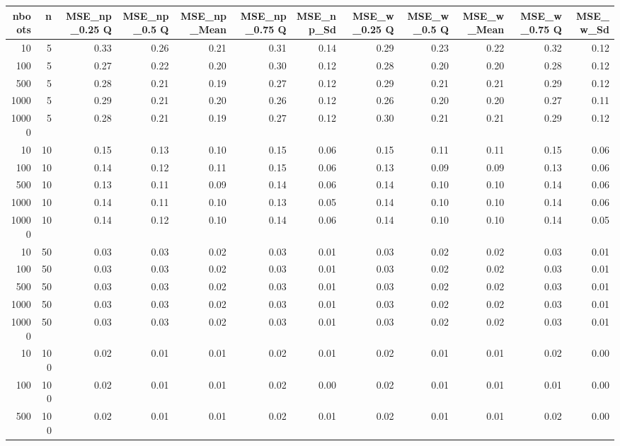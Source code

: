 \begin{table}[ht]
\centering
\begin{tabular}{rrrrrrrrrrrr}
  \hline
nboots & n & MSE\_np\_0.25 Q & MSE\_np\_0.5 Q & MSE\_np\_Mean & MSE\_np\_0.75 Q & MSE\_np\_Sd & MSE\_w\_0.25 Q & MSE\_w\_0.5 Q & MSE\_w\_Mean & MSE\_w\_0.75 Q & MSE\_w\_Sd \\ 
  \hline
10 & 5 & 0.33 & 0.26 & 0.21 & 0.31 & 0.14 & 0.29 & 0.23 & 0.22 & 0.32 & 0.12 \\ 
  100 & 5 & 0.27 & 0.22 & 0.20 & 0.30 & 0.12 & 0.28 & 0.20 & 0.20 & 0.28 & 0.12 \\ 
  500 & 5 & 0.28 & 0.21 & 0.19 & 0.27 & 0.12 & 0.29 & 0.21 & 0.21 & 0.29 & 0.12 \\ 
  1000 & 5 & 0.29 & 0.21 & 0.20 & 0.26 & 0.12 & 0.26 & 0.20 & 0.20 & 0.27 & 0.11 \\ 
  10000 & 5 & 0.28 & 0.21 & 0.19 & 0.27 & 0.12 & 0.30 & 0.21 & 0.21 & 0.29 & 0.12 \\ 
  10 & 10 & 0.15 & 0.13 & 0.10 & 0.15 & 0.06 & 0.15 & 0.11 & 0.11 & 0.15 & 0.06 \\ 
  100 & 10 & 0.14 & 0.12 & 0.11 & 0.15 & 0.06 & 0.13 & 0.09 & 0.09 & 0.13 & 0.06 \\ 
  500 & 10 & 0.13 & 0.11 & 0.09 & 0.14 & 0.06 & 0.14 & 0.10 & 0.10 & 0.14 & 0.06 \\ 
  1000 & 10 & 0.14 & 0.11 & 0.10 & 0.13 & 0.05 & 0.14 & 0.10 & 0.10 & 0.14 & 0.06 \\ 
  10000 & 10 & 0.14 & 0.12 & 0.10 & 0.14 & 0.06 & 0.14 & 0.10 & 0.10 & 0.14 & 0.05 \\ 
  10 & 50 & 0.03 & 0.03 & 0.02 & 0.03 & 0.01 & 0.03 & 0.02 & 0.02 & 0.03 & 0.01 \\ 
  100 & 50 & 0.03 & 0.03 & 0.02 & 0.03 & 0.01 & 0.03 & 0.02 & 0.02 & 0.03 & 0.01 \\ 
  500 & 50 & 0.03 & 0.03 & 0.02 & 0.03 & 0.01 & 0.03 & 0.02 & 0.02 & 0.03 & 0.01 \\ 
  1000 & 50 & 0.03 & 0.03 & 0.02 & 0.03 & 0.01 & 0.03 & 0.02 & 0.02 & 0.03 & 0.01 \\ 
  10000 & 50 & 0.03 & 0.03 & 0.02 & 0.03 & 0.01 & 0.03 & 0.02 & 0.02 & 0.03 & 0.01 \\ 
  10 & 100 & 0.02 & 0.01 & 0.01 & 0.02 & 0.01 & 0.02 & 0.01 & 0.01 & 0.02 & 0.00 \\ 
  100 & 100 & 0.02 & 0.01 & 0.01 & 0.02 & 0.00 & 0.02 & 0.01 & 0.01 & 0.01 & 0.00 \\ 
  500 & 100 & 0.02 & 0.01 & 0.01 & 0.02 & 0.01 & 0.02 & 0.01 & 0.01 & 0.02 & 0.00 \\ 

\end{tabular}
\end{table}
